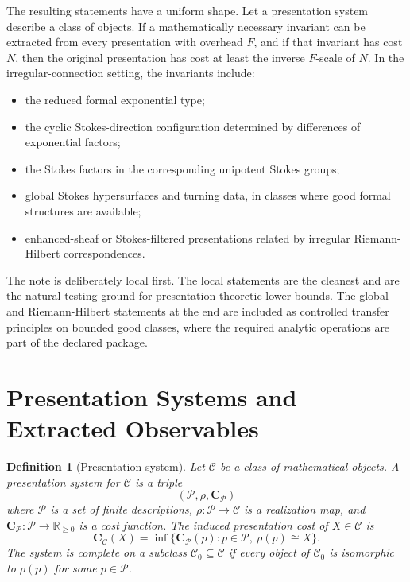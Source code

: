 \documentclass[11pt]{article}
\newtheorem{definition}[theorem]{Definition}
\begin{document}
The resulting statements have a uniform shape.  Let a presentation system describe a class of objects.  If a mathematically necessary invariant can be extracted from every presentation with overhead \(F\), and if that invariant has cost \(N\), then the original presentation has cost at least the inverse \(F\)-scale of \(N\).  In the irregular-connection setting, the invariants include:
\begin{itemize}[leftmargin=2em]
\item the reduced formal exponential type;
\item the cyclic Stokes-direction configuration determined by differences of exponential factors;
\item the Stokes factors in the corresponding unipotent Stokes groups;
\item global Stokes hypersurfaces and turning data, in classes where good formal structures are available;
\item enhanced-sheaf or Stokes-filtered presentations related by irregular Riemann-Hilbert correspondences.
\end{itemize}

The note is deliberately local first.  The local statements are the cleanest and are the natural testing ground for presentation-theoretic lower bounds.  The global and Riemann-Hilbert statements at the end are included as controlled transfer principles on bounded good classes, where the required analytic operations are part of the declared package.

\section{Presentation Systems and Extracted Observables}

\begin{definition}[Presentation system]
Let \(\mathcal C\) be a class of mathematical objects.  A presentation system for \(\mathcal C\) is a triple
\[
(\mathcal P,\rho,\mathbf C_{\mathcal P})
\]
where \(\mathcal P\) is a set of finite descriptions, \(\rho:\mathcal P\to \mathcal C\) is a realization map, and \(\mathbf C_{\mathcal P}:\mathcal P\to \mathbb R_{\ge 0}\) is a cost function.  The induced presentation cost of \(X\in\mathcal C\) is
\[
\mathbf C_{\mathcal C}(X)=
\inf\{\mathbf C_{\mathcal P}(p):p\in\mathcal P,\ \rho(p)\cong X\}.
\]
The system is complete on a subclass \(\mathcal C_0\subseteq \mathcal C\) if every object of \(\mathcal C_0\) is isomorphic to \(\rho(p)\) for some \(p\in\mathcal P\).
\end{definition}
\end{document}
